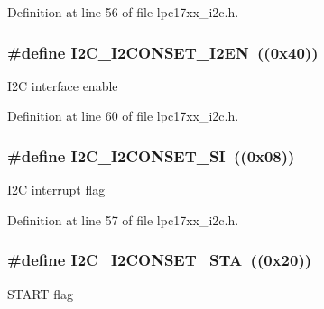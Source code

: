 Definition at line 56 of file lpc17xx\+\_\+i2c.\+h.

\subsubsection[{\texorpdfstring{I2\+C\+\_\+\+I2\+C\+O\+N\+S\+E\+T\+\_\+\+I2\+EN}{I2C_I2CONSET_I2EN}}]{\setlength{\rightskip}{0pt plus 5cm}\#define I2\+C\+\_\+\+I2\+C\+O\+N\+S\+E\+T\+\_\+\+I2\+EN~((0x40))}\hypertarget{group___i2_c___private___macros_gab836acc31e0572bb0d0db614f0641f15}{}\label{group___i2_c___private___macros_gab836acc31e0572bb0d0db614f0641f15}
I2C interface enable 

Definition at line 60 of file lpc17xx\+\_\+i2c.\+h.

\subsubsection[{\texorpdfstring{I2\+C\+\_\+\+I2\+C\+O\+N\+S\+E\+T\+\_\+\+SI}{I2C_I2CONSET_SI}}]{\setlength{\rightskip}{0pt plus 5cm}\#define I2\+C\+\_\+\+I2\+C\+O\+N\+S\+E\+T\+\_\+\+SI~((0x08))}\hypertarget{group___i2_c___private___macros_gaa447cd2686805ef8009fc599144ee3dc}{}\label{group___i2_c___private___macros_gaa447cd2686805ef8009fc599144ee3dc}
I2C interrupt flag 

Definition at line 57 of file lpc17xx\+\_\+i2c.\+h.

\subsubsection[{\texorpdfstring{I2\+C\+\_\+\+I2\+C\+O\+N\+S\+E\+T\+\_\+\+S\+TA}{I2C_I2CONSET_STA}}]{\setlength{\rightskip}{0pt plus 5cm}\#define I2\+C\+\_\+\+I2\+C\+O\+N\+S\+E\+T\+\_\+\+S\+TA~((0x20))}\hypertarget{group___i2_c___private___macros_gabaad3370eb35644c135d40f06adbbba0}{}\label{group___i2_c___private___macros_gabaad3370eb35644c135d40f06adbbba0}
S\+T\+A\+RT flag 

